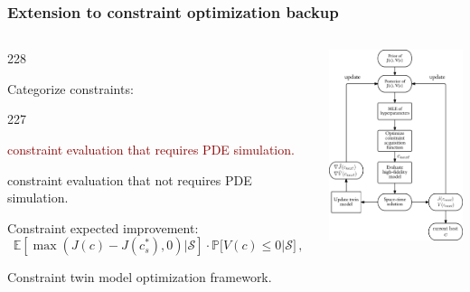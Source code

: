 \documentclass{beamer}
\newcommand{\barrow}{\item[\color{darkred}\ding{228}]}
\newcommand{\carrow}{\item[\color{darkred}\ding{227}]}
\begin{document}
\begin{frame}
    \frametitle{Extension to constraint optimization \hfill \scriptsize{backup}}\small
    \begin{columns}
    \begin{dinglist}{228}
        \barrow Categorize constraints:
        \begin{dinglist}{227}
            \carrow \textcolor{darkred}{constraint evaluation that requires PDE simulation.}
            \carrow constraint evaluation that not requires PDE simulation.
        \end{dinglist}
        \barrow Constraint expected improvement:
        $$
            \mathbb{E} 
            \left[\left. \max\left(J(c) - J(c^*_s), 0\right) \right.\Big| \mathcal{S}\right]\cdot
            \mathbb{P}\big[V(c)\le 0 \big| \mathcal{S}\big] \,,
            \label{EI form constraint}
        $$
        \barrow Constraint twin model optimization framework.
    \end{dinglist}
        \centering
        \includegraphics[width=4cm]{Bayconstraint.png}
    \end{columns}
\end{frame}
\end{document}
